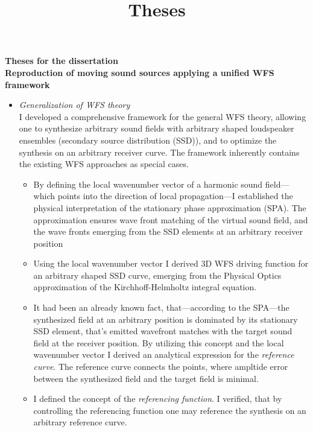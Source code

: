 \documentclass[a4paper,10pt]{article}
\title{Theses}
\date{}
\begin{document}
\begin{center}
  \textbf{\normalsize Theses for the dissertation \\
   		  \Large Reproduction of moving sound sources applying a unified WFS framework}\\[0.5cm]
\end{center}

\begin{itemize}
\item \emph{Generalization of WFS theory} \\ 
I developed a comprehensive framework for the general WFS theory, allowing one to synthesize arbitrary sound fields with arbitrary shaped loudspeaker ensembles (secondary source distribution (SSD)), and to optimize the synthesis on an arbitrary receiver curve. 
The framework inherently contains the existing WFS approaches as special cases.
\begin{itemize}
\item By defining the local wavenumber vector of a harmonic sound field---which points into the direction of local propagation---I  established the physical interpretation of the stationary phase approximation (SPA).
The approximation ensures wave front matching of the virtual sound field, and the wave fronts emerging from the SSD elements at an arbitrary receiver position
\item Using the local wavenumber vector I derived 3D WFS driving function for an arbitrary shaped SSD curve, emerging from the Physical Optics approximation of the Kirchhoff-Helmholtz integral equation.
\item It had been an already known fact, that---according to the SPA---the synthesized field at an arbitrary position is dominated by its stationary SSD element, that's emitted wavefront matches with the target sound field at the receiver position.
By utilizing this concept and the local wavenumber vector I derived an analytical expression for the \emph{reference curve}. The reference curve connects the points, where ampltide error between the synthesized field and the target field is minimal.
\item I defined the concept of the \emph{referencing function}.
I verified, that by controlling the referencing function one may reference the synthesis on an arbitrary reference curve.

\end{itemize}
\end{itemize}
\end{document}
